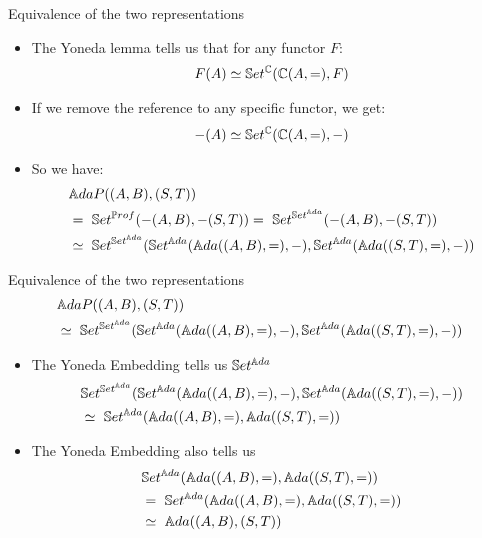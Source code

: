 \iffalse
\begin{frame}[fragile]{Equivalence of the two representations}
	\begin{itemize}
		\item The Yoneda lemma tells us that for any functor $F$:
		\begin{align*}
			F(A) \simeq \mathbb{S}et^{\mathbb{C}}(\mathbb{C}(A, =), F)
		\end{align*}
		\pause\item If we remove the reference to any specific functor, we get:
		\begin{align*}
			-(A) \simeq \mathbb{S}et^{\mathbb{C}}(\mathbb{C}(A, =), -)
		\end{align*}
		\vspace{-18pt}\pause\item So we have:
		\begin{align*}
			&\bAdaP ((A,B),(S,T))\\
			&=\ \bSet^{\bProf}(-(A, B), -(S, T)) =\ \bSet^{\bSet^\bAda}(-(A, B), -(S, T)) \\ 
			&\simeq\ \bSet^{\bSet^\bAda}(\bSet^\bAda(\bAda((A, B), =), -), \bSet^\bAda(\bAda((S, T), =), -))\\
		\end{align*}
	\end{itemize}
\end{frame}
\begin{frame}[fragile]{Equivalence of the two representations}
	\begin{align*}
		&\mathbb{A}daP ((A,B),(S,T))\\
		&\simeq\ \mathbb{S}et^{\mathbb{S}et^{\mathbb{A}da}}(\mathbb{S}et^{\mathbb{A}da}({\mathbb{A}da}((A, B), =), -), \mathbb{S}et^{\mathbb{A}da}({\mathbb{A}da}((S, T), =), -))
	\end{align*}
	\vspace{-16pt}
	\begin{itemize}
		\item The Yoneda Embedding tells us $\mathbb{S}et^{\mathbb{A}da}$
		\begin{align*}
			&\mathbb{S}et^{\mathbb{S}et^{\mathbb{A}da}}(\mathbb{S}et^{\mathbb{A}da}({\mathbb{A}da}((A, B), =), -), \mathbb{S}et^{\mathbb{A}da}({\mathbb{A}da}((S, T), =), -))\\ 
			&\simeq\  \mathbb{S}et^{\mathbb{A}da}({\mathbb{A}da}((A,B), =), {\mathbb{A}da}((S,T), =))
		\end{align*}
		\item The Yoneda Embedding also tells us 
		\begin{align*}
			&\mathbb{S}et^{\mathbb{A}da}({\mathbb{A}da}((A,B), =), {\mathbb{A}da}((S,T), =))\\
			&=\ \mathbb{S}et^{\mathbb{A}da}({\mathbb{A}da}((A,B), =), {\mathbb{A}da}((S,T), =))\\
			&\simeq\ {\mathbb{A}da}((A,B), (S,T))
		\end{align*}
	\end{itemize}
\end{frame}
